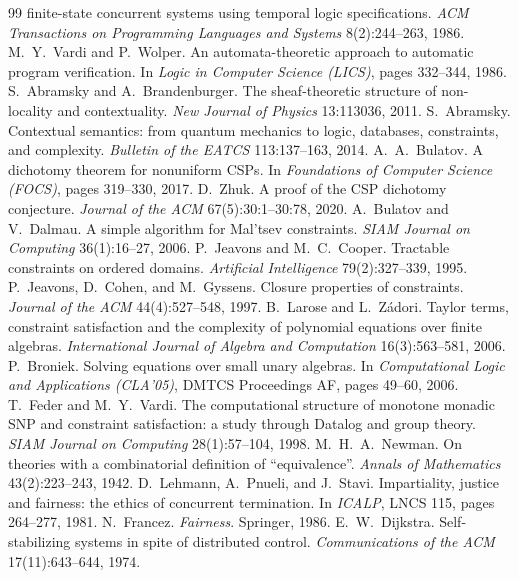 \begin{thebibliography}{99}
  finite-state concurrent systems using temporal logic specifications. \emph{ACM Transactions on
  Programming Languages and Systems} 8(2):244--263, 1986.
 M.~Y.~Vardi and P.~Wolper. An automata-theoretic approach to automatic program
  verification. In \emph{Logic in Computer Science (LICS)}, pages 332--344, 1986.
 S.~Abramsky and A.~Brandenburger. The sheaf-theoretic structure of
  non-locality and contextuality. \emph{New Journal of Physics} 13:113036, 2011.
 S.~Abramsky. Contextual semantics: from quantum mechanics to logic, databases,
  constraints, and complexity. \emph{Bulletin of the EATCS} 113:137--163, 2014.
 A.~A.~Bulatov. A dichotomy theorem for nonuniform CSPs. In \emph{Foundations of
  Computer Science (FOCS)}, pages 319--330, 2017.
 D.~Zhuk. A proof of the CSP dichotomy conjecture. \emph{Journal of the ACM}
  67(5):30:1--30:78, 2020.
 A.~Bulatov and V.~Dalmau. A simple algorithm for Mal'tsev constraints.
  \emph{SIAM Journal on Computing} 36(1):16--27, 2006.
 P.~Jeavons and M.~C.~Cooper. Tractable constraints on ordered domains.
  \emph{Artificial Intelligence} 79(2):327--339, 1995.
 P.~Jeavons, D.~Cohen, and M.~Gyssens. Closure properties of constraints.
  \emph{Journal of the ACM} 44(4):527--548, 1997.
 B.~Larose and L.~Z\'adori. Taylor terms, constraint satisfaction and the
  complexity of polynomial equations over finite algebras. \emph{International Journal of Algebra and
  Computation} 16(3):563--581, 2006.
 P.~Broniek. Solving equations over small unary algebras. In \emph{Computational
  Logic and Applications (CLA'05)}, DMTCS Proceedings AF, pages 49--60, 2006.
 T.~Feder and M.~Y.~Vardi. The computational structure of monotone monadic
  SNP and constraint satisfaction: a study through Datalog and group theory. \emph{SIAM Journal on
  Computing} 28(1):57--104, 1998.
 M.~H.~A.~Newman. On theories with a combinatorial definition of
  ``equivalence''. \emph{Annals of Mathematics} 43(2):223--243, 1942.
 D.~Lehmann, A.~Pnueli, and J.~Stavi. Impartiality, justice and fairness: the
  ethics of concurrent termination. In \emph{ICALP}, LNCS 115, pages 264--277, 1981.
 N.~Francez. \emph{Fairness}. Springer, 1986.
 E.~W.~Dijkstra. Self-stabilizing systems in spite of distributed control.
  \emph{Communications of the ACM} 17(11):643--644, 1974.

\end{thebibliography}
